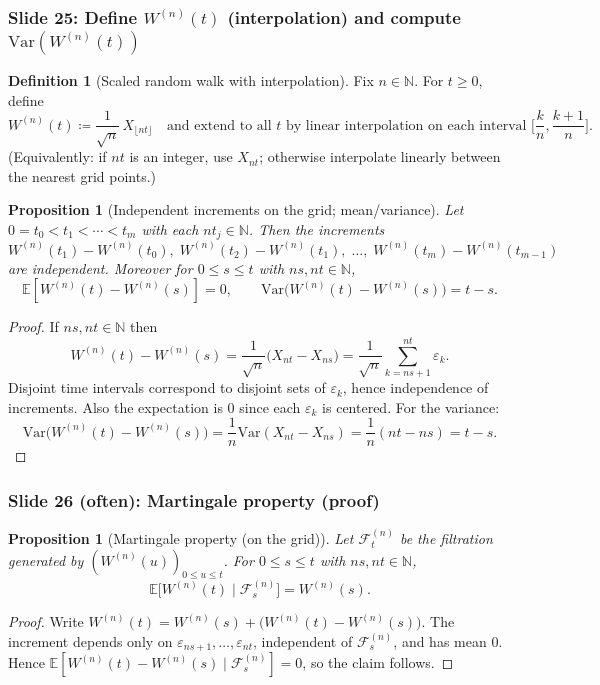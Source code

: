 \documentclass[11pt]{article}
\newtheorem{proposition}[theorem]{Proposition}
\theoremstyle{definition}
\newtheorem{definition}[theorem]{Definition}
\theoremstyle{remark}
\newcommand{\E}{\mathbb{E}}
\newcommand{\Var}{\mathrm{Var}}
\newcommand{\N}{\mathbb{N}}
\newcommand{\cF}{\mathcal{F}}
\begin{document}
\subsubsection*{Slide 25: Define $W^{(n)}(t)$ (interpolation) and compute $\Var(W^{(n)}(t))$}

\begin{definition}[Scaled random walk with interpolation]
Fix $n\in\N$. For $t\ge0$, define
\[
W^{(n)}(t) \coloneqq \frac{1}{\sqrt{n}}\,X_{\lfloor nt\rfloor}
\quad\text{and extend to all $t$ by linear interpolation on each interval }
\Big[\frac{k}{n},\frac{k+1}{n}\Big].
\]
(Equivalently: if $nt$ is an integer, use $X_{nt}$; otherwise interpolate linearly between the nearest grid points.)
\end{definition}

\begin{proposition}[Independent increments on the grid; mean/variance]
Let $0=t_0<t_1<\cdots<t_m$ with each $nt_j\in\N$.
Then the increments
\[
W^{(n)}(t_1)-W^{(n)}(t_0),\;
W^{(n)}(t_2)-W^{(n)}(t_1),\;\dots,\;
W^{(n)}(t_m)-W^{(n)}(t_{m-1})
\]
are independent. Moreover for $0\le s\le t$ with $ns,nt\in\N$,
\[
\E[W^{(n)}(t)-W^{(n)}(s)]=0,
\qquad
\Var\!\big(W^{(n)}(t)-W^{(n)}(s)\big)=t-s.
\]
\end{proposition}

\begin{proof}
If $ns,nt\in\N$ then
\[
W^{(n)}(t)-W^{(n)}(s)
=\frac{1}{\sqrt{n}}\big(X_{nt}-X_{ns}\big)
=\frac{1}{\sqrt{n}}\sum_{k=ns+1}^{nt}\varepsilon_k.
\]
Disjoint time intervals correspond to disjoint sets of $\varepsilon_k$, hence independence of increments.
Also the expectation is $0$ since each $\varepsilon_k$ is centered.
For the variance:
\[
\Var\!\big(W^{(n)}(t)-W^{(n)}(s)\big)
=\frac{1}{n}\Var(X_{nt}-X_{ns})
=\frac{1}{n}(nt-ns)=t-s.
\]
\end{proof}

\subsubsection*{Slide 26 (often): Martingale property (proof)}

\begin{proposition}[Martingale property (on the grid)]
Let $\cF^{(n)}_t$ be the filtration generated by $(W^{(n)}(u))_{0\le u\le t}$.
For $0\le s\le t$ with $ns,nt\in\N$,
\[
\E\big[W^{(n)}(t)\mid \cF^{(n)}_s\big]=W^{(n)}(s).
\]
\end{proposition}

\begin{proof}
Write $W^{(n)}(t)=W^{(n)}(s)+\big(W^{(n)}(t)-W^{(n)}(s)\big)$.
The increment depends only on $\varepsilon_{ns+1},\dots,\varepsilon_{nt}$,
independent of $\cF^{(n)}_s$, and has mean $0$.
Hence $\E[W^{(n)}(t)-W^{(n)}(s)\mid \cF^{(n)}_s]=0$, so the claim follows.
\end{proof}
\end{document}

